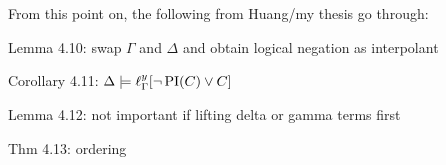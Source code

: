 



From this point on, the following from Huang/my thesis go through:\nopagebreak

Lemma 4.10: swap $\Gamma$ and $\Delta$ and obtain logical negation as interpolant 

Corollary 4.11: $\Delta \models \ell_{\Gamma}^{y}[ \lnot \operatorname{PI}(C) \lor C]$ 

Lemma 4.12: not important if lifting delta or gamma terms first 

Thm 4.13: ordering 

